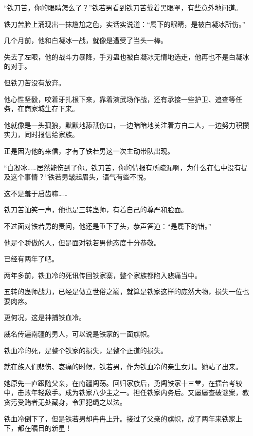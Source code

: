 
\begin{this_body}

“铁刀苦，你的眼睛怎么了？”铁若男看到铁刀苦戴着黑眼罩，有些意外地问道。

铁刀苦脸上涌现出一抹尴尬之色，实话实说道：“属下的眼睛，是被白凝冰所伤。”

几个月前，他和白凝冰一战，就像是遭受了当头一棒。

失去了左眼，他的战斗力暴降，手刃蛊也被白凝冰无情地选走，他再也不是白凝冰的对手。

但铁刀苦没有放弃。

他心性坚毅，咬着牙扎根下来，靠着演武场作战，还有承接一些护卫、追查等任务，在商家城生存下来。

他就像是一头孤狼，默默地舔舐伤口，一边暗暗地关注着方白二人，一边努力积攒实力，同时报信给家族。

正是因为他的来信，才有了铁若男这一次主动带队出现。

“白凝冰……居然能伤到了你。铁刀苦，你的情报有所疏漏啊，为什么在信中没有提及这个事情？”铁若男皱起眉头，语气有些不悦。

这不是羞于启齿嘛……

铁刀苦讪笑一声，他也是三转蛊师，有着自己的尊严和脸面。

不过面对铁若男的责问，他还是垂下了头，恭声答道：“是属下的错。”

他是个骄傲的人，但是面对铁若男他态度十分恭敬。

已经有两年了吧。

两年多前，铁血冷的死讯传回铁家寨，整个家族都陷入悲痛当中。

五转的蛊师战力，已经是傲立世俗之巅，就算是铁家这样的庞然大物，损失一位也要肉疼。

更何况，这是神捕铁血冷。

威名传遍南疆的男人，可以说是铁家的一面旗帜。

铁血冷的死，是整个铁家的损失，是整个正道的损失。

就在族人们悲伤、哀痛的时候，铁若男，作为铁血冷的亲生女儿。她站了出来。

她原先一直跟随父亲，在南疆闯荡。回归家族后，勇闯铁家十三堂，在擂台考较中，击败年轻敌手。成为铁家八少主之一。担任铁家内务后。又屡屡查破谜案，教贪污受贿者无处藏身，令罪犯绳之以法。

铁血冷倒下了，但是铁若男却冉冉上升。接过了父亲的旗帜，成了两年来铁家上下，都在瞩目的新星！


\end{this_body}
